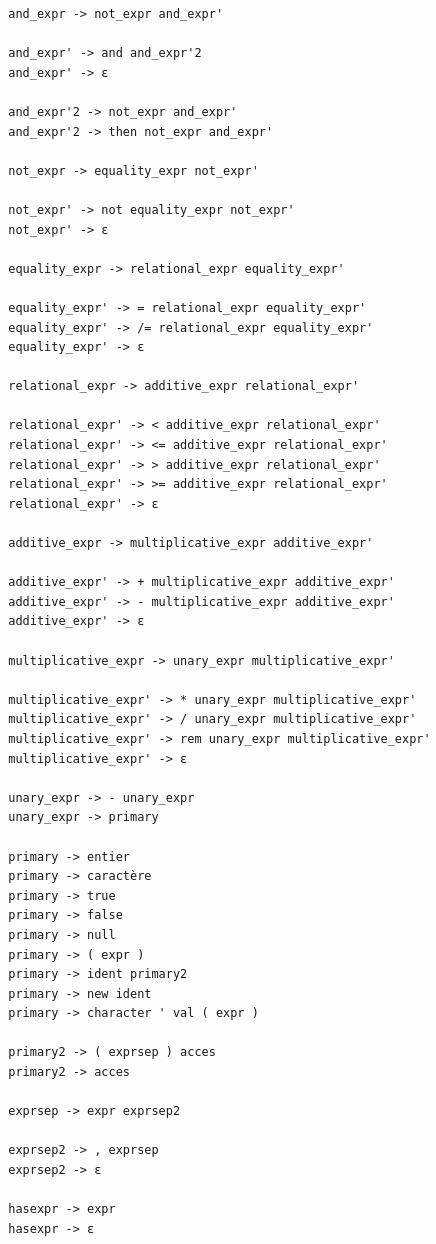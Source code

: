 \documentclass[french,a4paper]{article}
\begin{document}
\begin{verbatim}
        and_expr -> not_expr and_expr'

        and_expr' -> and and_expr'2
        and_expr' -> ε

        and_expr'2 -> not_expr and_expr'
        and_expr'2 -> then not_expr and_expr'

        not_expr -> equality_expr not_expr'

        not_expr' -> not equality_expr not_expr'
        not_expr' -> ε

        equality_expr -> relational_expr equality_expr'

        equality_expr' -> = relational_expr equality_expr'
        equality_expr' -> /= relational_expr equality_expr'
        equality_expr' -> ε

        relational_expr -> additive_expr relational_expr'

        relational_expr' -> < additive_expr relational_expr'
        relational_expr' -> <= additive_expr relational_expr'
        relational_expr' -> > additive_expr relational_expr'
        relational_expr' -> >= additive_expr relational_expr'
        relational_expr' -> ε

        additive_expr -> multiplicative_expr additive_expr'

        additive_expr' -> + multiplicative_expr additive_expr'
        additive_expr' -> - multiplicative_expr additive_expr'
        additive_expr' -> ε

        multiplicative_expr -> unary_expr multiplicative_expr'

        multiplicative_expr' -> * unary_expr multiplicative_expr'
        multiplicative_expr' -> / unary_expr multiplicative_expr'
        multiplicative_expr' -> rem unary_expr multiplicative_expr'
        multiplicative_expr' -> ε

        unary_expr -> - unary_expr
        unary_expr -> primary

        primary -> entier
        primary -> caractère
        primary -> true
        primary -> false
        primary -> null
        primary -> ( expr )
        primary -> ident primary2
        primary -> new ident
        primary -> character ' val ( expr )

        primary2 -> ( exprsep ) acces
        primary2 -> acces

        exprsep -> expr exprsep2

        exprsep2 -> , exprsep
        exprsep2 -> ε

        hasexpr -> expr
        hasexpr -> ε


\end{verbatim}
\end{document}

